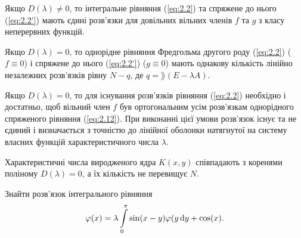 \begin{theorem}
	Якщо $D(\lambda) \ne 0$, то інтегральне рівняння (\ref{eq:2.2}) та спряжене до нього (\ref{eq:2.2'}) мають єдині розв'язки для довільних вільних членів $f$ та $g$ з класу неперервних функцій.
\end{theorem}
\begin{theorem}
	Якщо $D(\lambda) = 0$, то однорідне рівняння Фредгольма другого роду (\ref{eq:2.2}) ($f \equiv 0$) і спряжене до нього (\ref{eq:2.2'}) ($g \equiv 0$) мають однакову кількість лінійно незалежних розв'язків рівну $N - q$, де $q = \rang(E - \lambda A)$.
\end{theorem}
\begin{theorem}
	Якщо $D(\lambda) = 0$, то для існування розв'язків рівняння (\ref{eq:2.2}) необхідно і достатньо, щоб вільний член $f$ був ортогональним усім розв'язкам однорідного спряженого рівняння (\ref{eq:2.12}). При виконанні цієї умови розв'язок існує та не єдиний і визначається з точністю до лінійної оболонки натягнутої на систему власних функцій характеристичного числа $\lambda$.
\end{theorem}
\begin{corollary}
	Характеристичні числа виродженого ядра $K(x, y)$ співпадають з коренями поліному $D(\lambda) = 0$, а їх кількість не перевищує $N$.
\end{corollary}
\begin{example}
	Знайти розв’язок інтегрального рівняння \[ \varphi(x) = \lambda \displaystyle\int\limits_0^\pi \sin(x - y) \varphi(y \mathop{}\!\mathrm{d} y + \cos(x). \]
\end{example}
